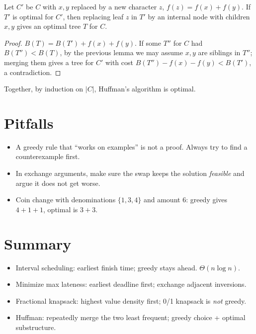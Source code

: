 \begin{lemma}
Let $C'$ be $C$ with $x,y$ replaced by a new character $z$, $f(z)=f(x)+f(y)$. If $T'$ is optimal for $C'$, then replacing
leaf $z$ in $T'$ by an internal node with children $x,y$ gives an optimal tree $T$ for $C$.
\end{lemma}
\begin{proof}
$B(T)=B(T')+f(x)+f(y)$. If some $T''$ for $C$ had $B(T'')<B(T)$, by the previous lemma we may assume $x,y$ are siblings in $T''$;
merging them gives a tree for $C'$ with cost $B(T'')-f(x)-f(y)<B(T')$, a contradiction.
\end{proof}
Together, by induction on $|C|$, Huffman's algorithm is optimal.

\section{Pitfalls}
\begin{itemize}
  \item A greedy rule that ``works on examples'' is not a proof. Always try to find a counterexample first.
  \item In exchange arguments, make sure the swap keeps the solution \emph{feasible} and argue it does not get worse.
  \item Coin change with denominations $\{1,3,4\}$ and amount 6: greedy gives $4+1+1$, optimal is $3+3$.
\end{itemize}

\section*{Summary}
\begin{itemize}
  \item Interval scheduling: earliest finish time; greedy stays ahead. $\Theta(n\log n)$.
  \item Minimize max lateness: earliest deadline first; exchange adjacent inversions.
  \item Fractional knapsack: highest value density first; 0/1 knapsack is \emph{not} greedy.
  \item Huffman: repeatedly merge the two least frequent; greedy choice + optimal substructure.
\end{itemize}
